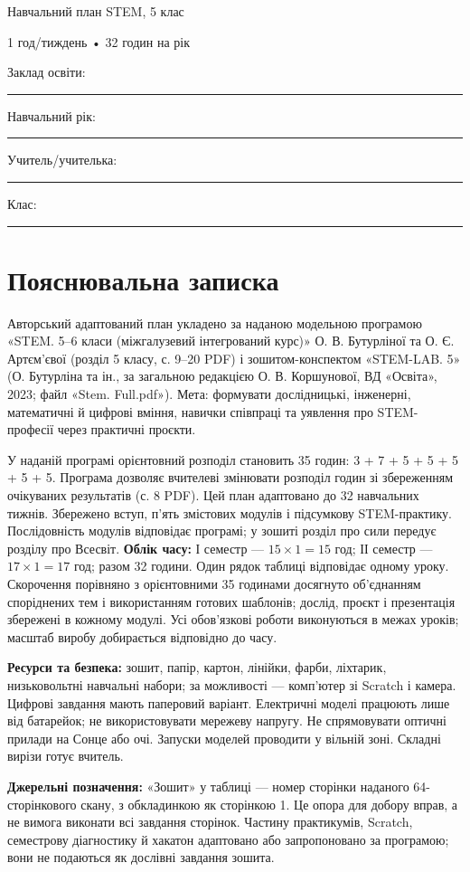 \documentclass[10pt,a4paper,landscape]{article}
\begin{document}
{\LARGE\color{accent} Навчальний план STEM, 5 клас}

{\large 1 год/тиждень • 32 годин на рік}

Заклад освіти: \rule{90mm}{0.3pt}\quad Навчальний рік: \rule{30mm}{0.3pt}

Учитель/учителька: \rule{95mm}{0.3pt}\quad Клас: \rule{25mm}{0.3pt}
\section*{Пояснювальна записка}
Авторський адаптований план укладено за наданою модельною програмою «STEM. 5--6 класи (міжгалузевий інтегрований курс)» О. В. Бутурліної та О. Є. Артєм’євої (розділ 5 класу, с. 9--20 PDF) і зошитом-конспектом «STEM-LAB. 5» (О. Бутурліна та ін., за загальною редакцією О. В. Коршунової, ВД «Освіта», 2023; файл «Stem. Full.pdf»).
Мета: формувати дослідницькі, інженерні, математичні й цифрові вміння, навички співпраці та уявлення про STEM-професії через практичні проєкти.

У наданій програмі орієнтовний розподіл становить 35 годин: 3 + 7 + 5 + 5 + 5 + 5 + 5. Програма дозволяє вчителеві змінювати розподіл годин зі збереженням очікуваних результатів (с. 8 PDF). Цей план адаптовано до 32 навчальних тижнів. Збережено вступ, п’ять змістових модулів і підсумкову STEM-практику. Послідовність модулів відповідає програмі; у зошиті розділ про сили передує розділу про Всесвіт.
\textbf{Облік часу:} І семестр — $15\times1=15$ год; ІІ семестр — $17\times1=17$ год; разом 32 години. Один рядок таблиці відповідає одному уроку. Скорочення порівняно з орієнтовними 35 годинами досягнуто об’єднанням споріднених тем і використанням готових шаблонів; дослід, проєкт і презентація збережені в кожному модулі. Усі обов’язкові роботи виконуються в межах уроків; масштаб виробу добирається відповідно до часу.

\textbf{Ресурси та безпека:} зошит, папір, картон, лінійки, фарби, ліхтарик, низьковольтні навчальні набори; за можливості — комп’ютер зі Scratch і камера. Цифрові завдання мають паперовий варіант. Електричні моделі працюють лише від батарейок; не використовувати мережеву напругу. Не спрямовувати оптичні прилади на Сонце або очі. Запуски моделей проводити у вільній зоні. Складні вирізи готує вчитель.

\textbf{Джерельні позначення:} «Зошит» у таблиці — номер сторінки наданого 64-сторінкового скану, з обкладинкою як сторінкою 1. Це опора для добору вправ, а не вимога виконати всі завдання сторінок. Частину практикумів, Scratch, семестрову діагностику й хакатон адаптовано або запропоновано за програмою; вони не подаються як дослівні завдання зошита.
\newpage
\end{document}
